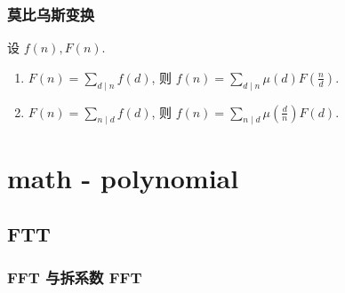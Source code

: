 \documentclass[UTF8, a4paper, titlepage, twoside]{ctexart}
\begin{document}
\subsubsection*{ 莫比乌斯变换 }

设 \(f(n), F(n)\).
\begin{enumerate}
    \item \(F(n) = \sum_{d \mid n} f(d)\), 则 \(f(n) = \sum_{d \mid n} \mu(d) F\left(\frac{n}{d}\right)\).
    \item \(F(n) = \sum_{n \mid d} f(d)\), 则 \(f(n) = \sum_{n \mid d} \mu\left(\frac{d}{n}\right) F(d)\).
\end{enumerate}

\newpage
\section{ math - polynomial }
\subsection{ FTT }
\subsubsection*{ FFT 与拆系数 FFT }
\end{document}

